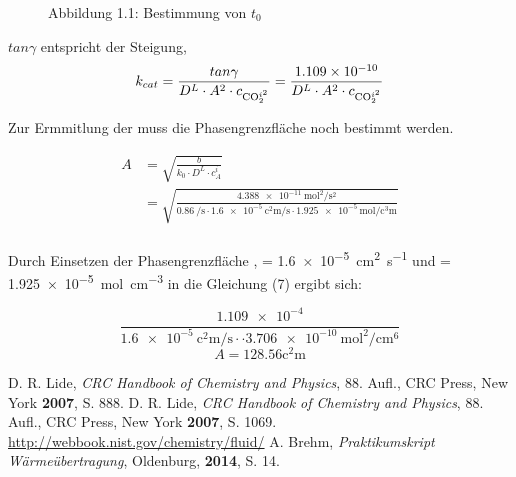 \documentclass{article}
\begin{document}
\begin{onehalfspace}
\begin{figure}[htbp!]
\caption*{Abbildung 1.1: Bestimmung von $t_0$ }

\end{figure}
$tan \gamma$ entspricht der Steigung, 
\begin{equation}
  k_{cat} = \frac{tan \gamma}{D^L \cdot A^2 \cdot c_{\ce{CO2}^{i^2}}} = \frac{\num{1.109e-10}}{D^L \cdot A^2 \cdot c_{\ce{CO2}^{i^2}}}
\end{equation}

Zur Ermmitlung der  muss die Phasengrenzfläche  noch bestimmt werden. 

\begin{align}
  A &= \sqrt{\frac{b}{k_0 \cdot D^L \cdot c_A^i}} \\
    &= \sqrt{\frac{\SI{4.388e-11}{\square\mol\per\square\second}}{\SI{0.86}{\per\second} \cdot \SI{1.6e-5}{\square\centi\meter\per\second} \cdot \SI{1.925e-5}{\mol\per\cubic\centi\meter} }}\\
\end{align}

Durch Einsetzen der Phasengrenzfläche ,  = \SI{1.6e-5}{\square\centi\meter\per\second} 
und  = \SI{1.925e-5}{\mol\per\cubic\centi\meter} in die Gleichung (7) ergibt sich:

\begin{equation}
 \frac{\num{1.109e-4}}{\SI{1.6e-5}{\square\centi\meter\per\second} \cdot  \cdot \SI{3.706e-10}{\square\mol\per\centi\meter\tothe{6}} }
\end{equation}
\begin{equation}
  A = 128.56 \si{\square\centi\meter}
\end{equation}
\begin{thebibliography}{}
D. R. Lide, \textit{CRC Handbook of Chemistry and Physics}, 88. Aufl., CRC Press, New York \textbf{2007}, S. 888.
D. R. Lide, \textit{CRC Handbook of Chemistry and Physics}, 88. Aufl., CRC Press, New York \textbf{2007}, S. 1069.
\url{http://webbook.nist.gov/chemistry/fluid/}
A. Brehm, \textit{Praktikumskript Wärmeübertragung}, Oldenburg, \textbf{2014},  S. 14.
\end{thebibliography}
\end{onehalfspace}
\end{document}

